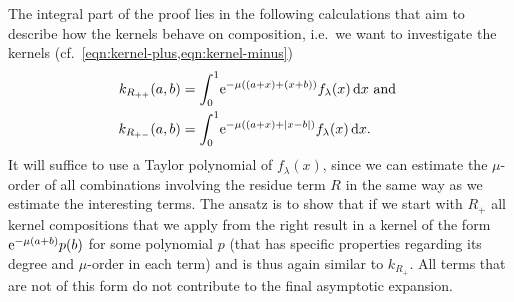 The integral part of the proof lies in the following calculations that aim to
describe how the kernels behave on composition, i.e.\ we want to investigate
the kernels (cf.\ \cref{eqn:kernel-plus,eqn:kernel-minus})
\begin{align*}
  k_{R_{++}}(a,b) &= \Int{x}{\Eto{-\mu((a + x) + (x + b))}f_\lambda(x)} \text{ and }\\
  k_{R_{+-}}(a,b) &= \Int{x}{\Eto{-\mu((a + x) + \Abs{x - b})}f_\lambda(x)}.
\end{align*}
It will suffice to use a Taylor polynomial of $f_\lambda(x)$, since we can
estimate the $\mu$-order of all combinations involving the residue term $R$ in
the same way as we estimate the interesting terms. The ansatz is to show that if
we start with $R_+$ all kernel compositions that we apply from the right
result in a kernel of the form $\Eto{-\mu(a+b)}p(b)$ for some polynomial $p$
(that has specific properties regarding its degree and $\mu$-order in each term)
and is thus again similar to $k_{R_+}$. All terms that are not of this form do not
contribute to the final asymptotic expansion.
